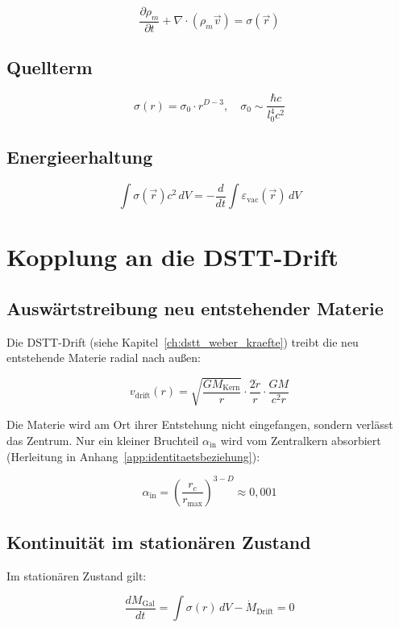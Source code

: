\[
\frac{\partial \rho_m}{\partial t} + \nabla \cdot (\rho_m \vec{v}) = \sigma(\vec{r})
\]

\subsection{Quellterm}

\[
\boxed{\sigma(r) = \sigma_0 \cdot r^{D-3}}, \quad \sigma_0 \sim \frac{\hbar c}{l_0^4 c^2}
\]

\subsection{Energieerhaltung}

\[
\int \sigma(\vec{r}) c^2 \, dV = -\frac{d}{dt} \int \varepsilon_{\text{vac}}(\vec{r}) \, dV
\]

\section{Kopplung an die DSTT-Drift}
\label{app:materieentstehung_drift}

\subsection{Auswärtstreibung neu entstehender Materie}
\label{sub:materieentstehung_auswaerts}

Die DSTT-Drift (siehe Kapitel~\ref{ch:dstt_weber_kraefte}) treibt die neu entstehende
Materie radial nach außen:

\[
v_{\text{drift}}(r) = \sqrt{\frac{GM_{\text{Kern}}}{r}} \cdot \frac{2\dot{r}}{r} \cdot \frac{GM}{c^2 r}
\]

Die Materie wird am Ort ihrer Entstehung nicht eingefangen, sondern verlässt das
Zentrum. Nur ein kleiner Bruchteil \( \alpha_{\text{in}} \) wird vom Zentralkern
absorbiert (Herleitung in Anhang~\ref{app:identitaetsbeziehung}):

\[
\alpha_{\text{in}} = \left( \frac{r_c}{r_{\text{max}}} \right)^{3-D} \approx 0,001
\]

\subsection{Kontinuität im stationären Zustand}
\label{sub:materieentstehung_kontinuitaet}

Im stationären Zustand gilt:

\[
\frac{dM_{\text{Gal}}}{dt} = \int \sigma(r) \, dV - \dot{M}_{\text{Drift}} = 0
\]

